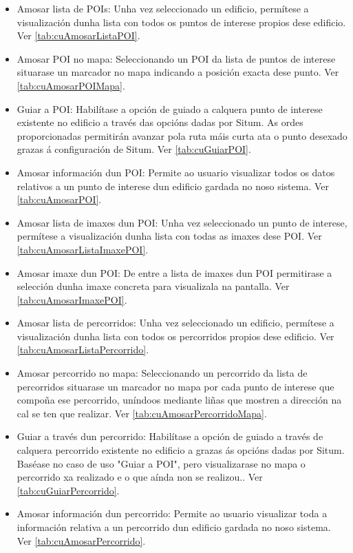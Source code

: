 \begin{itemize}
	\item Amosar lista de POIs: Unha vez seleccionado un edificio, permítese a visualización dunha lista con todos os puntos de interese propios dese edificio. Ver \ref{tab:cuAmosarListaPOI}.
	\item Amosar POI no mapa: Seleccionando un POI da lista de puntos de interese situarase un marcador no mapa indicando a posición exacta dese punto. Ver \ref{tab:cuAmosarPOIMapa}.
	\item Guiar a POI: Habilítase a opción de guiado a calquera punto de interese existente no edificio a través das opcións dadas por Situm. As ordes proporcionadas permitirán avanzar pola ruta máis curta ata o punto desexado grazas á configuración de Situm. Ver \ref{tab:cuGuiarPOI}.
	\item Amosar información dun POI: Permite ao usuario visualizar todos os datos relativos a un punto de interese dun edificio gardada no noso sistema. Ver \ref{tab:cuAmosarPOI}.
	\item Amosar lista de imaxes dun POI: Unha vez seleccionado un punto de interese, permítese a visualización dunha lista con todas as imaxes dese POI. Ver \ref{tab:cuAmosarListaImaxePOI}.
	\item Amosar imaxe dun POI: De entre a lista de imaxes dun POI permitirase a selección dunha imaxe concreta para visualizala na pantalla.  Ver \ref{tab:cuAmosarImaxePOI}.
	\item Amosar lista de percorridos: Unha vez seleccionado un edificio, permítese a visualización dunha lista con todos os percorridos propios dese edificio. Ver \ref{tab:cuAmosarListaPercorrido}.
	\item Amosar percorrido no mapa: Seleccionando un percorrido da lista de percorridos situarase un marcador no mapa por cada punto de interese que compoña ese percorrido, uníndoos mediante liñas que mostren a dirección na cal se ten que realizar. Ver \ref{tab:cuAmosarPercorridoMapa}.
	\item Guiar a través dun percorrido: Habilítase a opción de guiado a través de calquera percorrido existente no edificio a grazas ás opcións dadas por Situm. Baséase no caso de uso "Guiar a POI", pero visualizarase no mapa o percorrido xa realizado e o que aínda non se realizou.. Ver \ref{tab:cuGuiarPercorrido}.
	\item Amosar información dun percorrido: Permite ao usuario visualizar toda a información relativa a un percorrido dun edificio gardada no noso sistema. Ver \ref{tab:cuAmosarPercorrido}.
\end{itemize}


